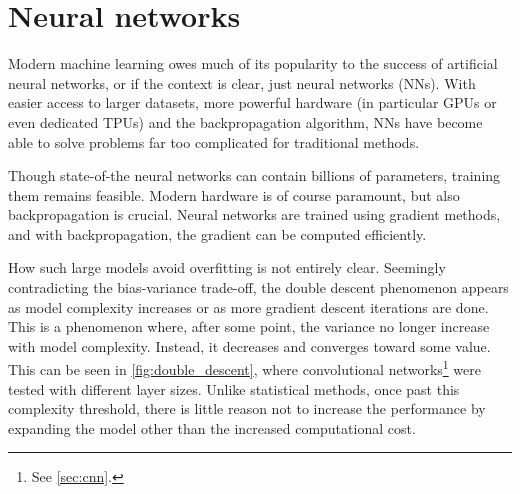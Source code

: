 \section{Neural networks}
Modern machine learning owes much of its popularity to the success of artificial neural networks, or if the context is clear, just neural networks (NNs).
With easier access to larger datasets, more powerful hardware (in particular GPUs or even dedicated TPUs) and the backpropagation algorithm, NNs have become able to solve problems far too complicated for traditional methods.

Though state-of-the neural networks can contain billions of parameters, training them remains feasible.
Modern hardware is of course paramount, but also backpropagation is crucial.
Neural networks are trained using gradient methods, and with backpropagation, the gradient can be computed efficiently.

How such large models avoid overfitting is not entirely clear.
Seemingly contradicting the bias-variance trade-off, the double descent phenomenon appears as model complexity increases or as more gradient descent iterations are done.
This is a phenomenon where, after some point, the variance no longer increase with model complexity.
Instead, it decreases and converges toward some value.
This can be seen in \cref{fig:double_descent}, where convolutional networks\footnote{See \cref{sec:cnn}.} were tested with different layer sizes.
Unlike statistical methods, once past this complexity threshold, there is little reason not to increase the performance by expanding the model other than the increased computational cost.

